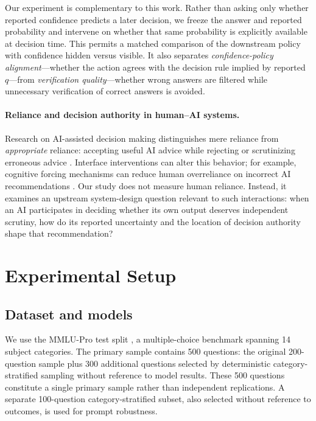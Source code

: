 \documentclass{article}
\begin{document}
Our experiment is complementary to this work. Rather than asking only whether reported confidence predicts a later decision, we freeze the answer and reported probability and intervene on whether that same probability is explicitly available at decision time. This permits a matched comparison of the downstream policy with confidence hidden versus visible. It also separates \emph{confidence-policy alignment}---whether the action agrees with the decision rule implied by reported $q$---from \emph{verification quality}---whether wrong answers are filtered while unnecessary verification of correct answers is avoided.

\paragraph{Reliance and decision authority in human--AI systems.}
Research on AI-assisted decision making distinguishes mere reliance from \emph{appropriate} reliance: accepting useful AI advice while rejecting or scrutinizing erroneous advice \citep{schemmer2022reliance}. Interface interventions can alter this behavior; for example, cognitive forcing mechanisms can reduce human overreliance on incorrect AI recommendations \citep{bucinca2021trust}. Our study does not measure human reliance. Instead, it examines an upstream system-design question relevant to such interactions: when an AI participates in deciding whether its own output deserves independent scrutiny, how do its reported uncertainty and the location of decision authority shape that recommendation?

\section{Experimental Setup}

\subsection{Dataset and models}

We use the MMLU-Pro test split \citep{wang2024mmlupro}, a multiple-choice benchmark spanning 14 subject categories. The primary sample contains 500 questions: the original 200-question sample plus 300 additional questions selected by deterministic category-stratified sampling without reference to model results. These 500 questions constitute a single primary sample rather than independent replications. A separate 100-question category-stratified subset, also selected without reference to outcomes, is used for prompt robustness.
\end{document}
